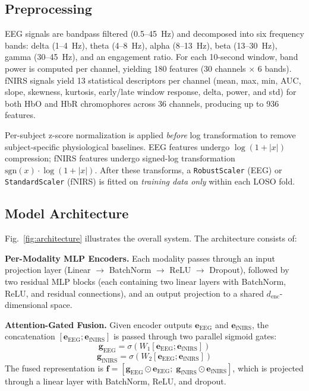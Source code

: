 \documentclass[conference]{IEEEtran}
\begin{document}
\subsection{Preprocessing}

EEG signals are bandpass filtered (0.5--45~Hz) and decomposed into six frequency bands: delta (1--4~Hz), theta (4--8~Hz), alpha (8--13~Hz), beta (13--30~Hz), gamma (30--45~Hz), and an engagement ratio. For each 10-second window, band power is computed per channel, yielding 180 features (30 channels $\times$ 6 bands). fNIRS signals yield 13 statistical descriptors per channel (mean, max, min, AUC, slope, skewness, kurtosis, early/late window response, delta, power, and std) for both HbO and HbR chromophores across 36 channels, producing up to 936 features.

Per-subject z-score normalization is applied \emph{before} log transformation to remove subject-specific physiological baselines. EEG features undergo $\log(1 + |x|)$ compression; fNIRS features undergo signed-log transformation $\text{sgn}(x) \cdot \log(1 + |x|)$. After these transforms, a \texttt{RobustScaler} (EEG) or \texttt{StandardScaler} (fNIRS) is fitted on \emph{training data only} within each LOSO fold.

\subsection{Model Architecture}

Fig.~\ref{fig:architecture} illustrates the overall system. The architecture consists of:

\textbf{Per-Modality MLP Encoders.} Each modality passes through an input projection layer (Linear $\rightarrow$ BatchNorm $\rightarrow$ ReLU $\rightarrow$ Dropout), followed by two residual MLP blocks (each containing two linear layers with BatchNorm, ReLU, and residual connections), and an output projection to a shared $d_\text{enc}$-dimensional space.

\textbf{Attention-Gated Fusion.} Given encoder outputs $\mathbf{e}_\text{EEG}$ and $\mathbf{e}_\text{fNIRS}$, the concatenation $[\mathbf{e}_\text{EEG}; \mathbf{e}_\text{fNIRS}]$ is passed through two parallel sigmoid gates:
\begin{equation}
    \mathbf{g}_\text{EEG} = \sigma(W_1 [\mathbf{e}_\text{EEG}; \mathbf{e}_\text{fNIRS}])
\end{equation}
\begin{equation}
    \mathbf{g}_\text{fNIRS} = \sigma(W_2 [\mathbf{e}_\text{EEG}; \mathbf{e}_\text{fNIRS}])
\end{equation}
The fused representation is $\mathbf{f} = [\mathbf{g}_\text{EEG} \odot \mathbf{e}_\text{EEG};\; \mathbf{g}_\text{fNIRS} \odot \mathbf{e}_\text{fNIRS}]$, which is projected through a linear layer with BatchNorm, ReLU, and dropout.
\end{document}
